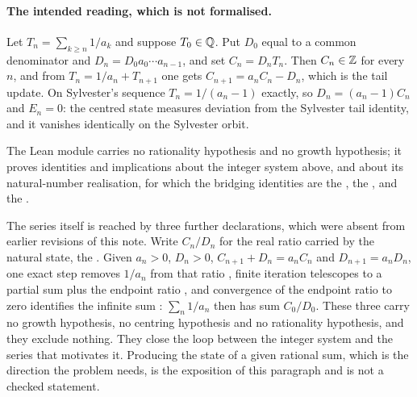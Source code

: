\documentclass[11pt]{article}
\begin{document}
\paragraph{The intended reading, which is not formalised.}
Let $T_n=\sum_{k\ge n}1/a_k$ and suppose $T_0\in\mathbb{Q}$.  Put $D_0$ equal to a
common denominator and $D_n=D_0a_0\cdots a_{n-1}$, and set $C_n=D_nT_n$.  Then
$C_n\in\mathbb{Z}$ for every $n$, and from $T_n=1/a_n+T_{n+1}$ one gets
$C_{n+1}=a_nC_n-D_n$, which is the tail update.  On Sylvester's sequence
$T_n=1/(a_n-1)$ exactly, so $D_n=(a_n-1)C_n$ and $E_n=0$: the centred state
measures deviation from the Sylvester tail identity, and it vanishes
identically on the Sylvester orbit.

The Lean module carries no rationality hypothesis and no growth hypothesis; it
proves identities and implications about the integer system above, and about its
natural-number realisation, for which the bridging identities are the
, the
, and the
.

The series itself is reached by three further declarations, which were absent
from earlier revisions of this note.  Write $C_n/D_n$ for the real ratio carried
by the natural state, the
.
Given $a_n>0$, $D_n>0$, $C_{n+1}+D_n=a_nC_n$ and $D_{n+1}=a_nD_n$, one exact
step removes $1/a_n$ from that ratio
, finite iteration telescopes to a partial sum plus the
endpoint ratio
, and convergence of the endpoint ratio to zero identifies the
infinite sum
: $\sum_n1/a_n$ then has sum $C_0/D_0$.  These three carry no
growth hypothesis, no centring hypothesis and no rationality hypothesis, and
they exclude nothing.  They close the loop between the integer system and the
series that motivates it.  Producing the state of a given rational sum, which is
the direction the problem needs, is the exposition of this paragraph and is not a
checked statement.
\end{document}
